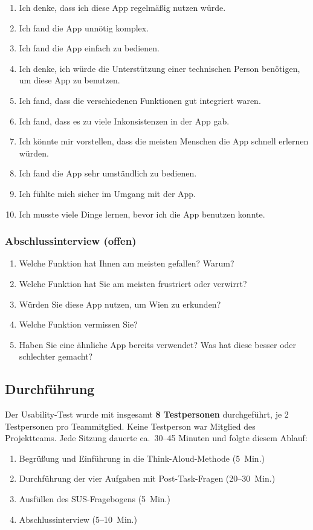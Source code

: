 \begin{enumerate}
  \item Ich denke, dass ich diese App regelmäßig nutzen würde.
  \item Ich fand die App unnötig komplex.
  \item Ich fand die App einfach zu bedienen.
  \item Ich denke, ich würde die Unterstützung einer technischen Person
        benötigen, um diese App zu benutzen.
  \item Ich fand, dass die verschiedenen Funktionen gut integriert waren.
  \item Ich fand, dass es zu viele Inkonsistenzen in der App gab.
  \item Ich könnte mir vorstellen, dass die meisten Menschen die App
        schnell erlernen würden.
  \item Ich fand die App sehr umständlich zu bedienen.
  \item Ich fühlte mich sicher im Umgang mit der App.
  \item Ich musste viele Dinge lernen, bevor ich die App benutzen konnte.
\end{enumerate}

\subsubsection*{Abschlussinterview (offen)}

\begin{enumerate}
  \item Welche Funktion hat Ihnen am meisten gefallen? Warum?
  \item Welche Funktion hat Sie am meisten frustriert oder verwirrt?
  \item Würden Sie diese App nutzen, um Wien zu erkunden?
  \item Welche Funktion vermissen Sie?
  \item Haben Sie eine ähnliche App bereits verwendet?
        Was hat diese besser oder schlechter gemacht?
\end{enumerate}

\subsection{Durchführung}

Der Usability-Test wurde mit insgesamt \textbf{8 Testpersonen}
durchgeführt, je 2 Testpersonen pro Teammitglied.
Keine Testperson war Mitglied des Projektteams.
Jede Sitzung dauerte ca.\ 30–45 Minuten und folgte diesem Ablauf:

\begin{enumerate}
  \item Begrüßung und Einführung in die Think-Aloud-Methode (5~Min.)
  \item Durchführung der vier Aufgaben mit Post-Task-Fragen (20–30~Min.)
  \item Ausfüllen des SUS-Fragebogens (5~Min.)
  \item Abschlussinterview (5–10~Min.)
\end{enumerate}
